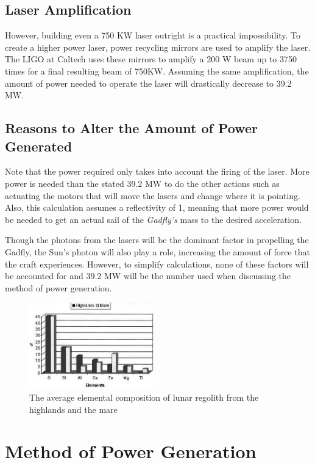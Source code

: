 \documentclass{aa}
\begin{document}
\subsection{Laser Amplification}
However, building even a 750 KW laser outright is a practical impossibility. To create a higher power laser, power recycling mirrors are used to amplify the laser. The LIGO at Caltech uses these mirrors to amplify a 200 W beam up to 3750 times for a final resulting beam of 750KW. Assuming the same amplification, the amount of power needed to operate the laser will drastically decrease to 39.2 MW. 
\subsection{Reasons to Alter the Amount of Power Generated }
Note that the power required only takes into account the firing of the laser. More power is needed than the stated 39.2 MW to do the other actions such as actuating the motors that will move the lasers and change where it is pointing. Also, this calculation assumes a reflectivity of 1, meaning that more power would be needed to get an actual sail of the \textit{Gadfly's} mass to the desired acceleration.

Though the photons from the lasers will be the dominant factor in propelling the Gadfly, the Sun's photon will also play a role, increasing the amount of force that the craft experiences. However, to simplify calculations, none of these factors will be accounted for and 39.2 MW will be the number used when discussing the method of power generation.

\begin{figure}[h!]

 \caption{The average elemental composition of lunar regolith from the highlands and the mare}
 
\includegraphics[width=0.48\textwidth]{Lunar Regolith Composition Graph.png}

\end{figure}

 \section{Method of Power Generation}
\end{document}
